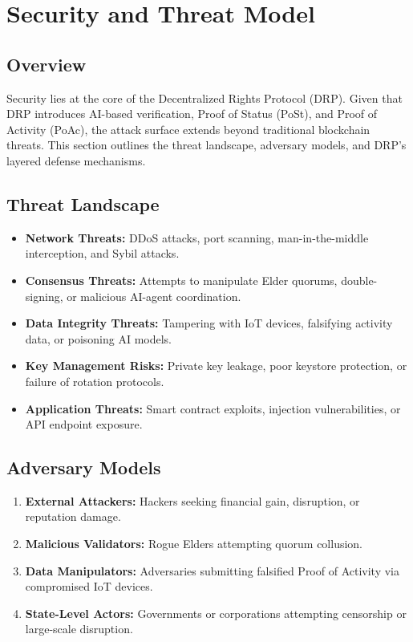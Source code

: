 \documentclass[11pt,a4paper]{article}
\begin{document}
\section{Security and Threat Model}

\subsection{Overview}
Security lies at the core of the Decentralized Rights Protocol (DRP). Given that DRP introduces AI-based verification, Proof of Status (PoSt), and Proof of Activity (PoAc), the attack surface extends beyond traditional blockchain threats. This section outlines the threat landscape, adversary models, and DRP’s layered defense mechanisms.

\subsection{Threat Landscape}
\begin{itemize}
    \item \textbf{Network Threats:} DDoS attacks, port scanning, man-in-the-middle interception, and Sybil attacks.
    \item \textbf{Consensus Threats:} Attempts to manipulate Elder quorums, double-signing, or malicious AI-agent coordination.
    \item \textbf{Data Integrity Threats:} Tampering with IoT devices, falsifying activity data, or poisoning AI models.
    \item \textbf{Key Management Risks:} Private key leakage, poor keystore protection, or failure of rotation protocols.
    \item \textbf{Application Threats:} Smart contract exploits, injection vulnerabilities, or API endpoint exposure.
\end{itemize}

\subsection{Adversary Models}
\begin{enumerate}
    \item \textbf{External Attackers:} Hackers seeking financial gain, disruption, or reputation damage.
    \item \textbf{Malicious Validators:} Rogue Elders attempting quorum collusion.
    \item \textbf{Data Manipulators:} Adversaries submitting falsified Proof of Activity via compromised IoT devices.
    \item \textbf{State-Level Actors:} Governments or corporations attempting censorship or large-scale disruption.
\end{enumerate}
\end{document}
